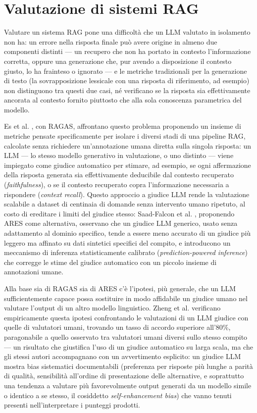 \section{Valutazione di sistemi RAG}
\label{sec:valutazione-rag}

Valutare un sistema RAG pone una difficoltà che un LLM valutato in isolamento non ha: un errore nella risposta finale
può avere origine in almeno due componenti distinti --- un recupero che non ha portato in contesto l'informazione
corretta, oppure una generazione che, pur avendo a disposizione il contesto giusto, lo ha frainteso o ignorato --- e
le metriche tradizionali per la generazione di testo (la sovrapposizione lessicale con una risposta di riferimento,
ad esempio) non distinguono tra questi due casi, né verificano se la risposta sia effettivamente ancorata al
contesto fornito piuttosto che alla sola conoscenza parametrica del modello.

Es et al. \cite{es2023ragas}, con RAGAS, affrontano questo problema proponendo un insieme di metriche pensate
specificamente per isolare i diversi stadi di una pipeline RAG, calcolate senza richiedere un'annotazione umana
diretta sulla singola risposta: un LLM --- lo stesso modello generativo in valutazione, o uno distinto --- viene
impiegato come giudice automatico per stimare, ad esempio, se ogni affermazione della risposta generata sia
effettivamente deducibile dal contesto recuperato (\emph{faithfulness}), o se il contesto recuperato copra
l'informazione necessaria a rispondere (\emph{context recall}). Questo approccio a giudice LLM rende la valutazione
scalabile a dataset di centinaia di domande senza intervento umano ripetuto, al costo di ereditare i limiti del
giudice stesso: Saad-Falcon et al. \cite{saadfalcon2024ares}, proponendo ARES come alternativa, osservano che un
giudice LLM generico, usato senza adattamento al dominio specifico, tende a essere meno accurato di un giudice più
leggero ma affinato su dati sintetici specifici del compito, e introducono un meccanismo di inferenza
statisticamente calibrato (\emph{prediction-powered inference}) che corregge le stime del giudice automatico con un
piccolo insieme di annotazioni umane.

Alla base sia di RAGAS sia di ARES c'è l'ipotesi, più generale, che un LLM sufficientemente capace possa sostituire
in modo affidabile un giudice umano nel valutare l'output di un altro modello linguistico. Zheng et al.
\cite{zheng2023llmjudge} verificano empiricamente questa ipotesi confrontando le valutazioni di un LLM giudice con
quelle di valutatori umani, trovando un tasso di accordo superiore all'80\%, paragonabile a quello osservato tra
valutatori umani diversi sullo stesso compito --- un risultato che giustifica l'uso di un giudice automatico su
larga scala, ma che gli stessi autori accompagnano con un avvertimento esplicito: un giudice LLM mostra bias
sistematici documentabili (preferenza per risposte più lunghe a parità di qualità, sensibilità all'ordine di
presentazione delle alternative, e soprattutto una tendenza a valutare più favorevolmente output generati da un
modello simile o identico a se stesso, il cosiddetto \emph{self-enhancement bias}) che vanno tenuti presenti
nell'interpretare i punteggi prodotti.

